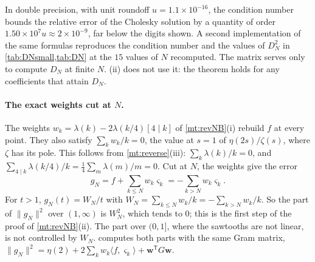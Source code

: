 \documentclass[11pt]{article}
\theoremstyle{definition}\newtheorem{definition}[theorem]{Definition}
\theoremstyle{remark}\newtheorem{remark}[theorem]{Remark}
\theoremstyle{definition}\newtheorem{axiom}{Axiom}
\begin{document}
In double precision, with unit roundoff $u=1.1\times10^{-16}$, the condition number bounds the relative error of the Cholesky solution by a quantity of order $1.50\times10^7u\approx2\times10^{-9}$, far below the digits shown. A second implementation of the same formulas reproduces the condition number and the values of $D_N^2$ in \cref{tab:DNsmall,tab:DN} at the $15$ values of $N$ recomputed. The matrix serves only to compute $D_N$ at finite $N$. (ii) does not use it: the theorem holds for any coefficients that attain $D_N$.

\paragraph{The exact weights cut at $N$.} The weights $w_k=\lambda(k)-2\lambda(k/4)[4\mid k]$ of \cref{mt:revNB}(i) rebuild $f$ at every point. They also satisfy $\sum_kw_k/k=0$, the value at $s=1$ of $\eta(2s)/\zeta(s)$, where $\zeta$ has its pole. This follows from \cref{mt:reverse}(iii): $\sum_k\lambda(k)/k=0$, and $\sum_{4\mid k}\lambda(k/4)/k=\frac14\sum_m\lambda(m)/m=0$. Cut at $N$, the weights give the error
\[
g_N=f+\sum_{k\le N}w_k\varsigma_k=-\sum_{k>N}w_k\varsigma_k.
\]
For $t>1$, $g_N(t)=W_N/t$ with $W_N=\sum_{k\le N}w_k/k=-\sum_{k>N}w_k/k$. So the part of $\|g_N\|^2$ over $(1,\infty)$ is $W_N^2$, which tends to $0$; this is the first step of the proof of \cref{mt:revNB}(ii). The part over $(0,1]$, where the sawtooths are not linear, is not controlled by $W_N$.  computes both parts with the same Gram matrix, $\|g_N\|^2=\eta(2)+2\sum_kw_k\langle f,\varsigma_k\rangle+\mathbf w^{\mathsf T}G\mathbf w$.
\end{document}

